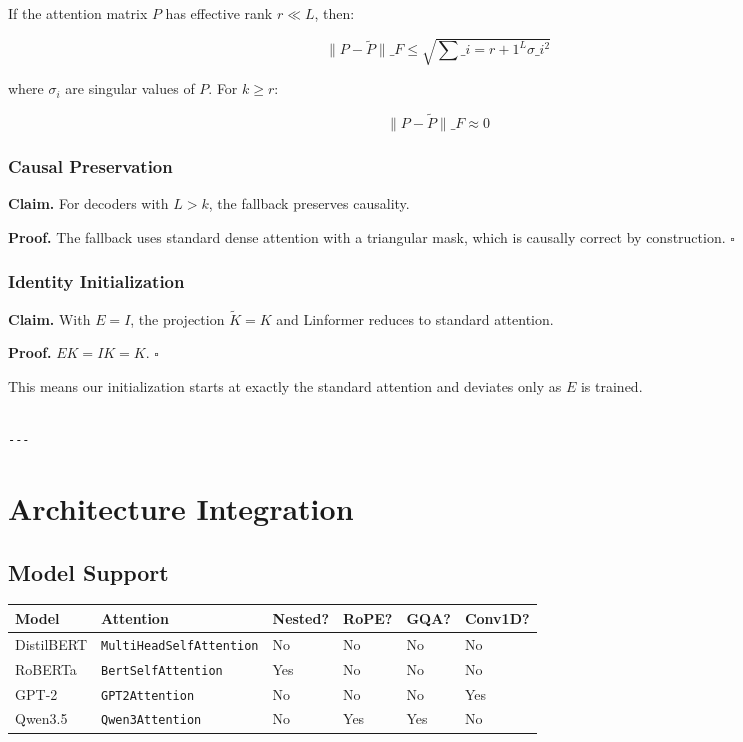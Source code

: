 If the attention matrix $P$ has effective rank $r \ll L$, then:

\[
\|P - \tilde{P}\|\_F \leq \sqrt{\sum\_{i=r+1}^L \sigma\_i^2}
\tag{4.4}
\]

where $\sigma_i$ are singular values of $P$. For $k \geq r$:

\[
\|P - \tilde{P}\|\_F \approx 0
\tag{4.5}
\]

\subsubsection{Causal Preservation}

\textbf{Claim.} For decoders with $L > k$, the fallback preserves causality.

\textbf{Proof.} The fallback uses standard dense attention with a triangular mask, 
which is causally correct by construction. $\square$

\subsubsection{Identity Initialization}

\textbf{Claim.} With $E = I$, the projection $\tilde{K} = K$ and Linformer 
reduces to standard attention.

\textbf{Proof.} $E K = I K = K$. $\square$

This means our initialization starts at exactly the standard attention and 
deviates only as $E$ is trained.
\begin{lstlisting}

---
\end{lstlisting}

\section{Architecture Integration}

\subsection{Model Support}

\begin{table}[H]
\centering
\small
\begin{tabular}{llllll}
\toprule
\textbf{Model} & \textbf{Attention} & \textbf{Nested?} & \textbf{RoPE?} & \textbf{GQA?} & \textbf{Conv1D?} \\
\midrule
DistilBERT & \texttt{MultiHeadSelfAttention} & No & No & No & No \\
RoBERTa & \texttt{BertSelfAttention} & Yes & No & No & No \\
GPT-2 & \texttt{GPT2Attention} & No & No & No & Yes \\
Qwen3.5 & \texttt{Qwen3Attention} & No & Yes & Yes & No \\
\bottomrule
\end{tabular}
\end{table}


